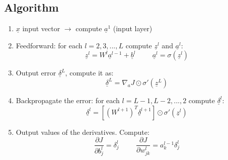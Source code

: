 \subsection{Algorithm}
\begin{enumerate}
    \item $\underline{x}$ input vector $\to$ compute $\underline{a}^1$ (input layer)
    \item Feedforward: for each $l=2,3,...,L$ compute $\underline{z}^l$ and $\underline{a}^l$:
    \[
        \underline{z}^l = W^l \underline{a}^{l-1} + \underline{b}^l \hspace{1cm} \underline{a}^l = \sigma(\underline{z}^l)     
    \] 
    \item Output error $\underline{\delta}^L$, compute it as:
    \[
        \underline{\delta}^L = \nabla_a J \odot \sigma'(\underline{z}^L)    
    \]
    \item Backpropagate the error: for each $l=L-1, L-2, ..., 2$ compute $\underline{\delta}^l$:
    \[
        \underline{\delta}^l = \left[(W^{l+1})^T \underline{\delta}^{l+1}\right] \odot \sigma'(\underline{z}^l)
    \]
    \item Output values of the derivatives. Compute:
    \[
        \dfrac{\partial J}{\partial b_j^l} = \delta_j^l \hspace{1cm} \dfrac{\partial J}{\partial w_{jk}^l} = a_k^{l-1} \delta_j^l
    \]
\end{enumerate}